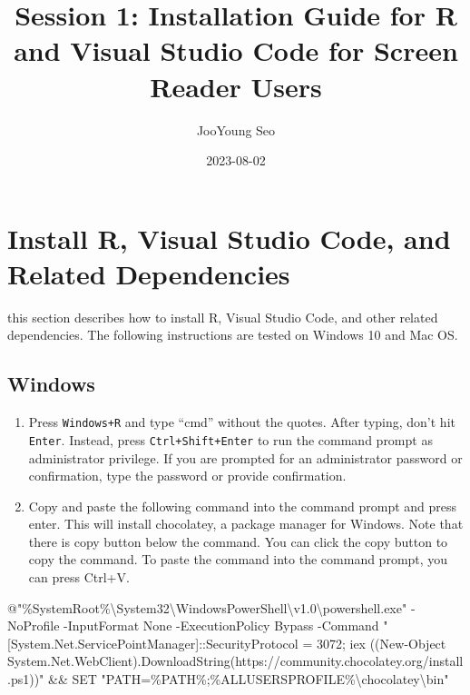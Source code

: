 \documentclass[
  letterpaper,
  DIV=11,
  numbers=noendperiod]{scrartcl}
\title{Session 1: Installation Guide for R and Visual Studio Code for
Screen Reader Users}
\author{JooYoung Seo}
\date{2023-08-02}
\newenvironment{Shaded}{\begin{snugshade}}{\end{snugshade}}
\newcommand{\AttributeTok}[1]{\textcolor[rgb]{0.40,0.45,0.13}{#1}}
\newcommand{\ExtensionTok}[1]{\textcolor[rgb]{0.00,0.23,0.31}{#1}}
\newcommand{\KeywordTok}[1]{\textcolor[rgb]{0.00,0.23,0.31}{#1}}
\newcommand{\NormalTok}[1]{\textcolor[rgb]{0.00,0.23,0.31}{#1}}
\newcommand{\StringTok}[1]{\textcolor[rgb]{0.13,0.47,0.30}{#1}}
\begin{document}
\maketitle
\hypertarget{sec-install-r-vscode}{%
\section{Install R, Visual Studio Code, and Related
Dependencies}\label{sec-install-r-vscode}}

this section describes how to install R, Visual Studio Code, and other
related dependencies. The following instructions are tested on Windows
10 and Mac OS.

\hypertarget{windows}{%
\subsection{Windows}\label{windows}}

\begin{enumerate}
\def\labelenumi{\arabic{enumi}.}
\item
  Press \texttt{Windows+R} and type ``cmd'' without the quotes. After
  typing, don't hit \texttt{Enter}. Instead, press
  \texttt{Ctrl+Shift+Enter} to run the command prompt as administrator
  privilege. If you are prompted for an administrator password or
  confirmation, type the password or provide confirmation.
\item
  Copy and paste the following command into the command prompt and press
  enter. This will install chocolatey, a package manager for Windows.
  Note that there is copy button below the command. You can click the
  copy button to copy the command. To paste the command into the command
  prompt, you can press Ctrl+V.
\end{enumerate}

\begin{Shaded}
\begin{Highlighting}[]
\ExtensionTok{@}\StringTok{"\%SystemRoot\%\textbackslash{}System32\textbackslash{}WindowsPowerShell\textbackslash{}v1.0\textbackslash{}powershell.exe"} \AttributeTok{{-}NoProfile} \AttributeTok{{-}InputFormat}\NormalTok{ None }\AttributeTok{{-}ExecutionPolicy}\NormalTok{ Bypass }\AttributeTok{{-}Command} \StringTok{"[System.Net.ServicePointManager]::SecurityProtocol = 3072; iex ((New{-}Object System.Net.WebClient).DownloadString(\textquotesingle{}https://community.chocolatey.org/install.ps1\textquotesingle{}))"} \KeywordTok{\&\&} \ExtensionTok{SET} \StringTok{"PATH=\%PATH\%;\%ALLUSERSPROFILE\%\textbackslash{}chocolatey\textbackslash{}bin"}
\end{Highlighting}
\end{Shaded}
\end{document}

